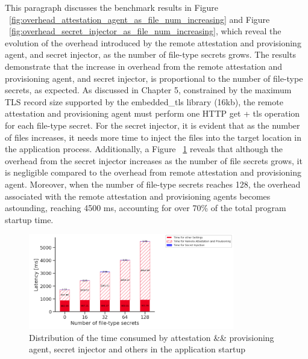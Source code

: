 This paragraph discusses the benchmark results in Figure ~\ref{fig:overhead_attestation_agent_as_file_num_increasing} and Figure ~\ref{fig:overhead_secret_injector_as_file_num_increasing}, which reveal the evolution of the overhead introduced by the remote attestation and provisioning agent, and secret injector, as the number of file-type secrets grows. The results demonstrate that the increase in 
overhead from the remote attestation and provisioning agent, and secret injector, is proportional to the number of file-type secrets, as expected. As discussed in Chapter 5, constrained by the maximum TLS record size supported by the embedded\_tls library (16kb), the remote attestation and provisioning 
agent must perform one HTTP get + tls operation for each file-type secret. For the secret injector, it is evident that as the number of files increases, it needs more time to inject the files into the target location in the application process.  Additionally, a 
Figure ~\ref{fig:startup_time_change_as_file_type_secret_increasing} reveals that although the overhead from the secret injector increases as the number of file secrets grows, it is negligible compared to the overhead from remote attestation and provisioning agent. Moreover, when the number of file-type secrets reaches 128, 
the overhead associated with the remote attestation and provisioning agents becomes astounding, reaching 4500 ms, accounting for over 70\% of the total program startup time.

\begin{figure}[H]
    \centering
    \includegraphics[width=0.8\textwidth]{images/startup_time_change_as_file_type_secret_increasing.PNG}
    \caption[Distribution of the time consumed by attestation \&\& provisioning agent, secret injector and others in the application startup]{Distribution of the time consumed by attestation \&\& provisioning agent, secret injector and others in the application startup}
    \label{fig:startup_time_change_as_file_type_secret_increasing}
\end{figure}



